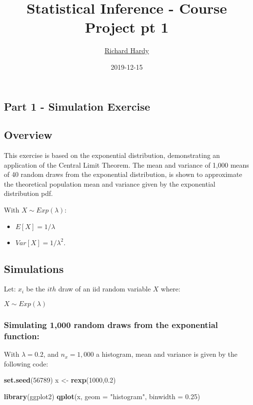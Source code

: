 \documentclass[]{article}
\title{Statistical Inference - Course Project pt 1}
\author{\href{https://github.com/rphardy}{Richard Hardy}}
\date{2019-12-15}
\newenvironment{Shaded}{\begin{snugshade}}{\end{snugshade}}
\newcommand{\DataTypeTok}[1]{\textcolor[rgb]{0.13,0.29,0.53}{#1}}
\newcommand{\DecValTok}[1]{\textcolor[rgb]{0.00,0.00,0.81}{#1}}
\newcommand{\FloatTok}[1]{\textcolor[rgb]{0.00,0.00,0.81}{#1}}
\newcommand{\KeywordTok}[1]{\textcolor[rgb]{0.13,0.29,0.53}{\textbf{#1}}}
\newcommand{\NormalTok}[1]{#1}
\newcommand{\StringTok}[1]{\textcolor[rgb]{0.31,0.60,0.02}{#1}}
\begin{document}
\maketitle

\hypertarget{part-1---simulation-exercise}{%
\subsection{Part 1 - Simulation
Exercise}\label{part-1---simulation-exercise}}

\hypertarget{overview}{%
\subsection{Overview}\label{overview}}

This exercise is based on the exponential distribution, demonstrating an
application of the Central Limit Theorem. The mean and variance of 1,000
means of 40 random draws from the exponential distribution, is shown to
approximate the theoretical population mean and variance given by the
exponential distribution pdf.

With \(X \sim Exp(\lambda)\):

\begin{itemize}
\item
  \(E[X] = 1/\lambda\)
\item
  \(Var[X] = 1/\lambda^2\).
\end{itemize}

\hypertarget{simulations}{%
\subsection{Simulations}\label{simulations}}

Let: \(x_i\) be the \(ith\) draw of an iid random variable \(X\) where:

\(X \sim Exp(\lambda)\)

\hypertarget{simulating-1000-random-draws-from-the-exponential-function}{%
\subsubsection{Simulating 1,000 random draws from the exponential
function:}\label{simulating-1000-random-draws-from-the-exponential-function}}

With \(\lambda = 0.2\), and \(n_x = 1,000\) a histogram, mean and
variance is given by the following code:

\begin{Shaded}
\begin{Highlighting}[]
\KeywordTok{set.seed}\NormalTok{(}\DecValTok{56789}\NormalTok{)}
\NormalTok{x <-}\StringTok{ }\KeywordTok{rexp}\NormalTok{(}\DecValTok{1000}\NormalTok{,}\FloatTok{0.2}\NormalTok{)}

\KeywordTok{library}\NormalTok{(ggplot2)}
\KeywordTok{qplot}\NormalTok{(x, }\DataTypeTok{geom =} \StringTok{"histogram"}\NormalTok{, }\DataTypeTok{binwidth =} \FloatTok{0.25}\NormalTok{)}
\end{Highlighting}
\end{Shaded}
\end{document}
